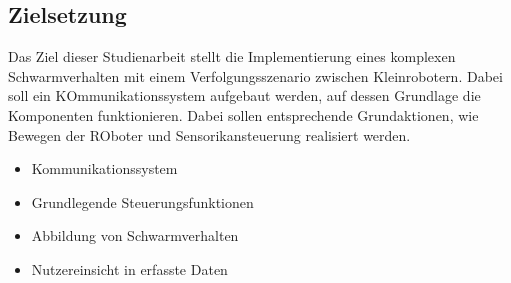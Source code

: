 \begin{comment}
	Die Aufgangslage stellen die einzelnen ROboter dar, die unter der Mindstorm SOftware funktionieren und dadurch einzeln agieren können. Dabei ist keinerlei Kommunikation zwischen den einzelnen ROboter möglich und somit keinerlei Realisierung für ein Schwarmverhalten. Die Roboter haben verschiedene Möglichkeiten durch WLAN, Bluetooth zur KOmmunikation, wobei keines von LEGO MIndstorm dirket zur Verfügung steht. Diese Schnittstellen werden lediglich zur Nutzerinteraktion, sowie dem drahtlosen starten und debuugen der Software genutzt.
\end{comment}

\subsection{Zielsetzung}

Das Ziel dieser Studienarbeit stellt die Implementierung eines komplexen Schwarmverhalten mit einem Verfolgungsszenario zwischen Kleinrobotern. Dabei soll ein KOmmunikationssystem aufgebaut werden, auf dessen Grundlage die Komponenten funktionieren. Dabei sollen entsprechende Grundaktionen, wie Bewegen der ROboter und Sensorikansteuerung realisiert werden.

\begin{itemize}
	\item Kommunikationssystem
	\item Grundlegende Steuerungsfunktionen
	\item Abbildung von Schwarmverhalten
	\item Nutzereinsicht in erfasste Daten
\end{itemize}

\begin{comment}
	\subsection{Erwartetes Ergebnis}
	
	Erwartet wird ein Ergebnis, indem der Nutzer des Systems über eine mobile App mithilfe einer zentralen STeuereinheit einen beliebigen Kontext für ein ausgewähltes Schwarmverhalten starten kann. Dabei soll eine abstrakte IMplementierung beachtet werden, indem verschiedene RObotertypen und Szenarien für Schwarmverhalten dargestellt sind, um wenn erwünscht ein komplexes Szanrio mit unterschiedlichen RObotern zu starten um definierte AUfgaben zu lösen. Dabei ist vor allem die Implementierung der Grundsteuerung mitsammt der Kommunikation des Systems entscheident.
\end{comment}